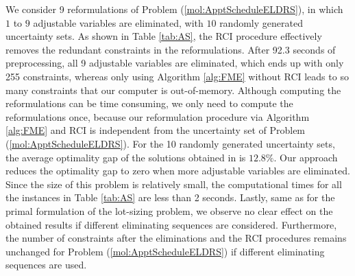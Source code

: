 \documentclass[fleqn,orsc,blindrev]{informs4}
\begin{document}
We consider 9 reformulations of Problem (\ref{mol:ApptScheduleELDRS}), in which $1$ to $9$ adjustable variables are eliminated, with $10$ randomly generated uncertainty sets.  As shown in Table \ref{tab:AS}, the RCI procedure effectively removes the redundant constraints in the reformulations. After 92.3 seconds of preprocessing, all 9 adjustable variables are eliminated, which ends up with only 255 constraints, whereas only using Algorithm \ref{alg:FME} without RCI leads to so many constraints that our computer is out-of-memory. Although computing the reformulations can be time consuming, we only need to compute the reformulations once, because our reformulation procedure via Algorithm \ref{alg:FME} and RCI is independent from the uncertainty set of Problem (\ref{mol:ApptScheduleELDRS}). For the 10 randomly generated uncertainty sets, the average optimality gap of the solutions obtained in \cite{bsz17} is $12.8\%$. Our approach reduces the optimality gap to zero when more adjustable variables are eliminated. Since the size of this problem is relatively small, the computational times for all the instances in Table \ref{tab:AS} are less than 2 seconds.  {Lastly, same as for the primal formulation of the lot-sizing problem, we observe no clear effect on the obtained results if different eliminating sequences are considered. Furthermore, the number of constraints after the eliminations and the RCI procedures remains unchanged for Problem (\ref{mol:ApptScheduleELDRS}) if different eliminating sequences are used.}
\end{document}
